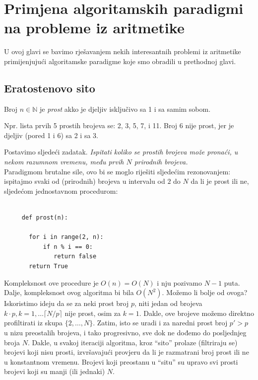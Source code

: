 \chapter{Primjena algoritamskih paradigmi na probleme iz aritmetike}


U ovoj glavi se bavimo rješavanjem nekih interesantnih problemi iz
aritmetike primijenjujući algoritamske paradigme koje smo obradili u prethodnoj glavi.

\section{Eratostenovo sito}

\begin{definition}
 	Broj $n \in \mathbb{N}$ je \textit{prost} akko je djeljiv isključivo sa 1 i sa samim sobom. 
\end{definition}

Npr. lista prvih 5 prostih brojeva se: 2, 3, 5, 7, i 11. Broj 6 nije prost, jer je djeljiv (pored 1 i 6) sa 2 i sa 3. 

Postavimo sljedeći zadatak. \emph{
Ispitati koliko se prostih brojeva može pronaći,
u nekom razumnom vremenu, među prvih ${N}$ prirodnih brojeva.} \\ 


Paradigmom brutalne sile, ovo bi se moglo riješiti sljedećim rezonovanjem: ispitajmo svaki od (prirodnih) brojeva u intervalu od $2$ do ${N}$ da li je prost ili ne, sljedećom jednostavnom procedurom:

\begin{verbatim}
     
     def prost(n):
       
       for i in range(2, n):
           if n % i == 0:
              return false
       return True
\end{verbatim}
Kompleksnost ove procedure je $O(n)=O(N)$ i nju pozivamo $N-1$ puta. Dalje, kompleksnost ovog algoritma bi bila $O(N^2)$. Možemo  li bolje od ovoga? \\

 Iskoristimo ideju da se za neki prost broj $p$, niti jedan od brojeva $k\cdot p, k = 1, \ldots \lceil N/ p \rceil$ nije prost, osim za $k=1$. Dakle, ove brojeve možemo direktno profiltirati iz skupa $\{2, \ldots, N\}$. Zatim, isto se uradi  i za naredni prost broj $p' >p$ u nizu preostalih brojeva, i tako progresivno, sve dok ne dođemo do posljednjeg broja $N$. Dakle, u svakoj iteraciji algoritma, kroz ``sito'' prolaze (filtriraju se) brojevi koji nisu prosti, izvršavajući   provjeru da li je razmatrani broj prost ili ne u konstantnom vremenu. Brojevi koji preostanu u ``situ'' su upravo svi prosti brojevi koji su manji (ili jednaki) $N$.

